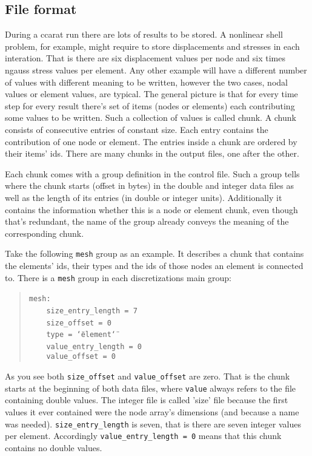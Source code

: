 \subsection{File format}

During a ccarat run there are lots of results to be stored. A nonlinear
shell problem, for example, might require to store displacements and
stresses in each interation. That is there are six displacement values
per node and six times ngauss stress values per element. Any other
example will have a different number of values with different meaning
to be written, however the two cases, nodal values or element values,
are typical. The general picture is that for every time step for every
result there's set of items (nodes or elements) each contributing
some values to be written. Such a collection of values is called chunk.
A chunk consists of consecutive entries of constant size. Each entry
contains the contribution of one node or element. The entries inside
a chunk are ordered by their items' ids. There are many chunks in
the output files, one after the other.

Each chunk comes with a group definition in the control file. Such
a group tells where the chunk starts (offset in bytes) in the double
and integer data files as well as the length of its entries (in double
or integer units). Additionally it contains the information whether
this is a node or element chunk, even though that's redundant, the
name of the group already conveys the meaning of the corresponding
chunk.

Take the following \texttt{mesh} group as an example. It describes
a chunk that contains the elements' ids, their types and the ids of
those nodes an element is connected to. There is a \texttt{mesh} group
in each discretizations main group: 

\begin{quote}
\texttt{mesh:~}~\\
 \texttt{~~~~size{\_}entry{\_}length~=~7~}~\\
 \texttt{~~~~size{\_}offset~=~0~}~\\
 \texttt{~~~~type~=~\char`\"{}element\char`\"{}~}~\\
 \texttt{~~~~value{\_}entry{\_}length~=~0~}~\\
 \texttt{~~~~value{\_}offset~=~0 }
\end{quote}
As you see both \texttt{size{\_}offset} and \texttt{value{\_}offset}
are zero. That is the chunk starts at the beginning of both data files,
where \texttt{value} always refers to the file containing double values.
The integer file is called 'size' file because the first values it
ever contained were the node array's dimensions (and because a name
was needed). \texttt{size{\_}entry{\_}length} is seven, that is
there are seven integer values per element. Accordingly \texttt{value{\_}entry{\_}length
= 0} means that this chunk contains no double values.

